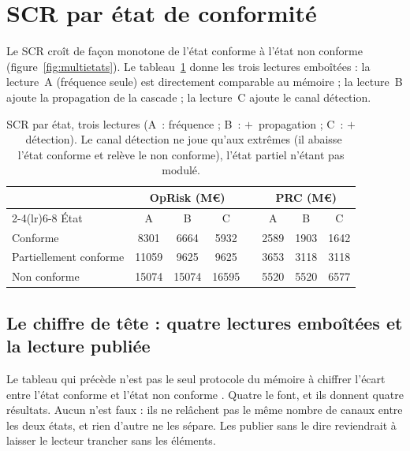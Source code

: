 
\section{SCR par état de conformité}

Le SCR croît de façon monotone de l'état conforme à l'état non conforme
(figure~\ref{fig:multietats}). Le tableau~\ref{tab:scretat} donne les trois lectures emboîtées :
la lecture~A (fréquence seule) est directement comparable au mémoire ; la lecture~B ajoute la
propagation de la cascade ; la lecture~C ajoute le canal détection.

\begin{table}[htbp]\centering\small
\renewcommand{\arraystretch}{1.25}
\begin{tabular}{@{}l ccc c ccc@{}}
\toprule
& \multicolumn{3}{c}{\textbf{OpRisk} (M\euro)} & & \multicolumn{3}{c}{\textbf{PRC} (M\euro)} \\
\cmidrule(lr){2-4}\cmidrule(lr){6-8}
État & A & B & C & & A & B & C \\
\midrule
Conforme               & 8301  & 6664  & 5932  & & 2589 & 1903 & 1642 \\
Partiellement conforme & 11059 & 9625  & 9625  & & 3653 & 3118 & 3118 \\
Non conforme           & 15074 & 15074 & 16595 & & 5520 & 5520 & 6577 \\
\bottomrule
\end{tabular}
\caption{SCR par état, trois lectures (A~: fréquence ; B~: $+$~propagation ; C~:
$+$~détection). Le canal détection ne joue qu'aux extrêmes (il
abaisse l'état conforme et relève le non conforme), l'état partiel n'étant pas modulé.}
\label{tab:scretat}
\end{table}

\subsection*{Le chiffre de tête : quatre lectures emboîtées et la lecture publiée}
\label{sec:chiffre-de-tete}

Le tableau qui précède n'est pas le seul protocole du mémoire à chiffrer \og l'écart entre l'état
conforme et l'état non conforme \fg{}. Quatre le font, et ils donnent quatre résultats. Aucun
n'est faux : ils ne relâchent pas le même nombre de canaux entre les deux états, et rien
d'autre ne les sépare. Les publier sans le dire reviendrait à laisser le lecteur trancher sans les éléments.

